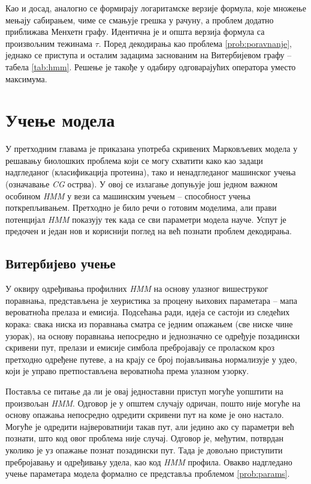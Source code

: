 \documentclass[12pt,oneside]{memoir}
\begin{document}
\begin{CJK}{UTF8}{ipxm}
Као и досад, аналогно се формирају логаритамске верзије формула, које множење мењају сабирањем, чиме се смањује грешка у рачуну, а проблем додатно приближава Менхетн графу. Идентична је и општа верзија формула са произвољним тежинама $\tau$. Поред декодирања као проблема \ref{prob:poravnanje}, једнако се приступа и осталим задацима заснованим на Витербијевом графу -- табела \ref{tab:hmm}. Решење је такође у одабиру одговарајућих оператора уместо максимума.

\chapter{Учење модела}
У претходним главама је приказана употреба скривених Марковљевих модела у решавању биолошких проблема који се могу схватити како као задаци надгледаног (класификација протеина), тако и ненадгледаног машинског учења (означавање \textit{CG} острва). У овој се излагање допуњује још једном важном особином \textit{HMM} у вези са машинским учењем -- способност учења поткрепљивањем. Претходно је било речи о готовим моделима, али прави потенцијал \textit{HMM} показују тек када се сви параметри модела науче. Успут је предочен и један нов и кориснији поглед на већ познати проблем декодирања.

\section{Витербијево учење}
У оквиру одређивања профилних \textit{HMM} на основу улазног вишеструког поравнања, представљена је хеуристика за процену њихових параметара -- мапа вероватноћа прелаза и емисија. Подсећања ради, идеја се састоји из следећих корака: свака ниска из поравнања сматра се једним опажањем (све ниске чине узорак), на основу поравнања непосредно и једнозначно се одређује позадински скривени пут, прелази и емисије симбола пребројавају се проласком кроз претходно одређене путеве, а на крају се број појављивања нормализује у удео, који је управо претпостављена вероватноћа према улазном узорку.

Поставља се питање да ли је овај једноставни приступ могуће уопштити на произвољан \textit{HMM}. Одговор је у општем случају одричан, пошто није могуће на основу опажања непосредно одредити скривени пут на коме је оно настало. Могуће је одредити највероватнији такав пут, али једино ако су параметри већ познати, што код овог проблема није случај. Одговор је, међутим, потврдан уколико је уз опажање познат позадински пут. Тада је довољно приступити пребројавању и одређивању удела, као код \textit{HMM} профила. Овакво надгледано учење параметара модела формално се представља проблемом \ref{prob:params}.


\end{CJK}
\end{document}
